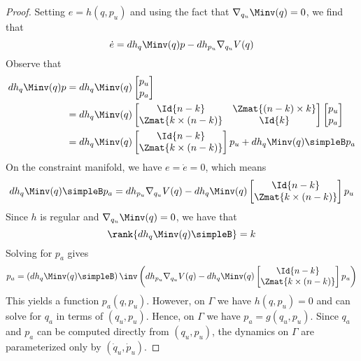 \begin{proof}
    Setting \(e = h(q,p_u)\) and using the fact that 
    \(\nabla_{q_u}\Minv(q) = 0\), we find that
    \[
        \dot{e} = dh_q\Minv(q)p - dh_{p_u}\nabla_{q_u}V(q)
    \]
    Observe that
    \begin{align*}
        dh_q\Minv(q)p &= dh_q\Minv(q) \begin{bmatrix}p_u \\ p_a \end{bmatrix} \\
          &= dh_q\Minv(q) \begin{bmatrix}
              \Id{n-k} & \Zmat{(n-k)\times k} \\
              \Zmat{k \times(n-k)} & \Id{k} 
              \end{bmatrix} \begin{bmatrix} p_u \\ p_a \end{bmatrix} \\
        &= dh_q\Minv(q)\begin{bmatrix} \Id{n-k} \\ \Zmat{k \times
        (n-k)}\end{bmatrix} p_u + dh_q \Minv(q)\simpleB p_a
    \end{align*}
    On the constraint manifold, we have \(e = \dot{e} = 0\), which means
    \[
        dh_q\Minv(q)\simpleB p_a = dh_{p_u}\nabla_{q_u}V(q) -
            dh_q\Minv(q)\begin{bmatrix} 
            \Id{n-k} \\ \Zmat{k \times (n-k)}\end{bmatrix} p_u
    \]
    Since \(h\) is regular and \(\nabla_{q_u}\Minv(q) = 0\), we have that 
    \[
        \rank{dh_q\Minv(q)\simpleB} = k
    \]
    Solving for \(p_a\) gives
    \[
        p_a = \left(dh_q\Minv(q)\simpleB\right)\inv
        \left(dh_{p_u}\nabla_{q_u}V(q) - 
            dh_q\Minv(q)\begin{bmatrix} 
        \Id{n-k} \\ \Zmat{k \times (n-k)}\end{bmatrix} p_u \right)
    \]
    This yields a function \(p_a(q,p_u)\). However, on \(\Gamma\) we have 
    \(h(q,p_u) = 0\) and can solve for \(q_a\) in terms of \((q_u,p_u)\).
    Hence, on \(\Gamma\) we have \(p_a = g(q_u,p_u)\). Since \(q_a\) and
    \(p_a\) can be computed directly from \((q_u,p_u)\), the dynamics on
    \(\Gamma\) are parameterized only by \((\dot{q}_u,\dot{p}_u)\).
\end{proof}

